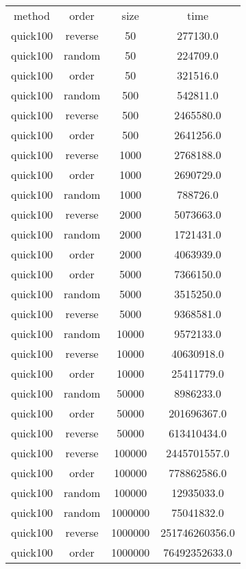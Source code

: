 \begin{table}
\begin{tabular}{cccc}
method & order & size & time \\
quick100 & reverse & 50 & 277130.0 \\
quick100 & random & 50 & 224709.0 \\
quick100 & order & 50 & 321516.0 \\
quick100 & random & 500 & 542811.0 \\
quick100 & reverse & 500 & 2465580.0 \\
quick100 & order & 500 & 2641256.0 \\
quick100 & reverse & 1000 & 2768188.0 \\
quick100 & order & 1000 & 2690729.0 \\
quick100 & random & 1000 & 788726.0 \\
quick100 & reverse & 2000 & 5073663.0 \\
quick100 & random & 2000 & 1721431.0 \\
quick100 & order & 2000 & 4063939.0 \\
quick100 & order & 5000 & 7366150.0 \\
quick100 & random & 5000 & 3515250.0 \\
quick100 & reverse & 5000 & 9368581.0 \\
quick100 & random & 10000 & 9572133.0 \\
quick100 & reverse & 10000 & 40630918.0 \\
quick100 & order & 10000 & 25411779.0 \\
quick100 & random & 50000 & 8986233.0 \\
quick100 & order & 50000 & 201696367.0 \\
quick100 & reverse & 50000 & 613410434.0 \\
quick100 & reverse & 100000 & 2445701557.0 \\
quick100 & order & 100000 & 778862586.0 \\
quick100 & random & 100000 & 12935033.0 \\
quick100 & random & 1000000 & 75041832.0 \\
quick100 & reverse & 1000000 & 251746260356.0 \\
quick100 & order & 1000000 & 76492352633.0 \\
\end{tabular}
\end{table}
